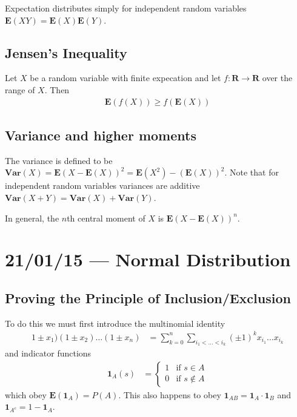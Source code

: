 \documentclass[10pt]{report}
\begin{document}
Expectation distributes simply for independent random variables $\mathbf{E}(XY) = \mathbf{E}(X)\mathbf{E}(Y)$.

\section{Jensen's Inequality}

Let $X$ be a random variable with finite expecation and let $f:\mathbf{R} \to \mathbf{R}$ over the range of $X$. Then
\begin{align}
    \mathbf{E}(f(X)) \geq f(\mathbf{E}(X))
\end{align}

\section{Variance and higher moments}

The variance is defined to be $\mathbf{Var}(X) = \mathbf{E}(X - \mathbf{E}(X))^2 = \mathbf{E}(X^2) - (\mathbf{E}(X))^2$. Note that for independent random variables variances are additive $\mathbf{Var}(X + Y) = \mathbf{Var}(X) + \mathbf{Var}(Y)$. 

In general, the $n$th central moment of $X$ is $\mathbf{E}\left( X - \mathbf{E}(X) \right)^n$. 

\chapter{21/01/15 --- Normal Distribution}

\section{Proving the Principle of Inclusion/Exclusion}

To do this we must first introduce the multinomial identity
\begin{align}
    1 \pm x_1)(1 \pm x_2)\dots (1 \pm x_n) &= \sum\limits_{k=0}^{n}\sum\limits_{i_1 <\dots  <i_k}^{}\left( \pm 1 \right)^k x_{i_1}\dots x_{i_k}
\end{align}
and indicator functions
\begin{align}
    \mathbf{1}_{A}(s) &= 
    \begin{cases}
        1 &\mbox{if } s \in A\\
        0 &\mbox{if } s \notin A
    \end{cases}
\end{align}
which obey $\mathbf{E}\left( \mathbf{1}_A \right) = P(A)$. This also happens to obey $\mathbf{1}_{AB} = \mathbf{1}_A \cdot \mathbf{1}_B$ and $\mathbf{1}_{A^c} = 1 - \mathbf{1}_A$.
\end{document}
